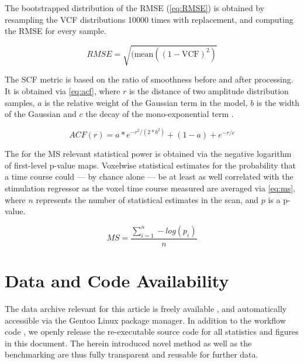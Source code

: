 The bootstrapped distribution of the RMSE (\cref{eq:RMSE}) is obtained by resampling the VCF distributions 10000 times with replacement, and computing the RMSE for every sample.

\begin{equation} \label{eq:RMSE}
        RMSE = \sqrt{(\text{mean}((1 - \text{VCF})^2)}
\end{equation}

The SCF metric is based on the ratio of smoothness before and after processing.
It is obtained via \cref{eq:acf}, where $r$ is the distance of two amplitude distribution samples, $a$ is the relative weight of the Gaussian term in the model, $b$ is the width of the Gaussian and $c$ the decay of the mono-exponential term \cite{cox2017fmri}.

\begin{equation} \label{eq:acf}
        ACF(r)
        = a * e^{ -r^{2}/ (2 * b^{2}) } + (1 - a) + e^{-r/c}
\end{equation}

The for the MS relevant statistical power is obtained via the negative logarithm of first-level p-value maps.
Voxelwise statistical estimates for the probability that a time course could --- by chance alone --- be at least as well correlated with the stimulation regressor as the voxel time course measured are averaged via \cref{eq:ms}, where $n$ represents the number of statistical estimates in the scan, and $p$ is a p-value.

\begin{equation} \label{eq:ms}
        M\!S = \frac{\sum_{i=1}^n -log(p_i)}{n}
\end{equation}

\section{Data and Code Availability}

The data archive relevant for this article is freely available \cite{mlebe_bidsdata}, and automatically accessible via the Gentoo Linux package manager.
In addition to the workflow code \cite{mlebe, samri}, we openly release the re-executable source code \cite{mlebe_repsep} for all statistics and figures in this document.
The herein introduced novel method as well as the benchmarking are thus fully transparent and reusable for further data.